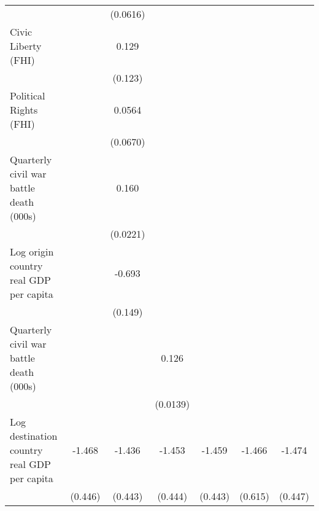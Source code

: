 \begin{table}[htbp]
\begin{tabular}{l*{6}{c}}
                    &                     &    (0.0616)         &                     &                     &                     &                     \\
[1em]
Civic Liberty (FHI) &                     &       0.129         &                     &                     &                     &                     \\
                    &                     &     (0.123)         &                     &                     &                     &                     \\
[1em]
Political Rights (FHI)&                     &      0.0564         &                     &                     &                     &                     \\
                    &                     &    (0.0670)         &                     &                     &                     &                     \\
[1em]
Quarterly civil war battle death (000s)&                     &       0.160\sym{***}&                     &                     &                     &                     \\
                    &                     &    (0.0221)         &                     &                     &                     &                     \\
[1em]
Log origin country real GDP per capita&                     &      -0.693\sym{***}&                     &                     &                     &                     \\
                    &                     &     (0.149)         &                     &                     &                     &                     \\
[1em]
Quarterly civil war battle death (000s)&                     &                     &       0.126\sym{***}&                     &                     &                     \\
                    &                     &                     &    (0.0139)         &                     &                     &                     \\
[1em]
Log destination country real GDP per capita&      -1.468\sym{**} &      -1.436\sym{**} &      -1.453\sym{**} &      -1.459\sym{**} &      -1.466\sym{*}  &      -1.474\sym{**} \\
                    &     (0.446)         &     (0.443)         &     (0.444)         &     (0.443)         &     (0.615)         &     (0.447)         \\

\end{tabular}
\end{table}
